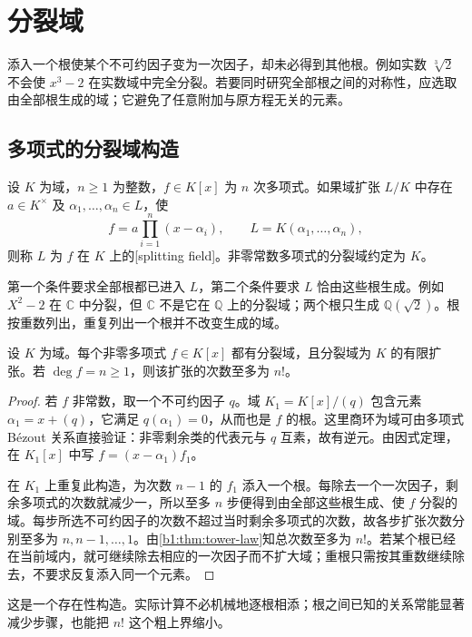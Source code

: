 
\section{分裂域}
\label{b1:sec:1501}


%
%

添入一个根使某个不可约因子变为一次因子，却未必得到其他根。例如实数 \(\sqrt[3]2\) 不会使 \(x^3-2\) 在实数域中完全分裂。若要同时研究全部根之间的对称性，应选取由全部根生成的域；它避免了任意附加与原方程无关的元素。

\subsection{多项式的分裂域构造}
\label{b1:subsec:1501:01}

\begin{definition}\label{b1:def:splitting-field}
	设 \(K\) 为域，\(n\geq1\) 为整数，\(f\in K[x]\) 为 \(n\) 次多项式。如果域扩张 \(L/K\) 中存在 \(a\in K^\times\) 及 \(\alpha_1,\ldots,\alpha_n\in L\)，使
	\[
		f=a\prod_{i=1}^n(x-\alpha_i),\qquad L=K(\alpha_1,\ldots,\alpha_n),
	\]
	则称 \(L\) 为 \(f\) 在 \(K\) 上的[splitting field]。非零常数多项式的分裂域约定为 \(K\)。
\end{definition}
第一个条件要求全部根都已进入 \(L\)，第二个条件要求 \(L\) 恰由这些根生成。例如 \(X^2-2\) 在 \(\mathbb C\) 中分裂，但 \(\mathbb C\) 不是它在 \(\mathbb Q\) 上的分裂域；两个根只生成 \(\mathbb Q(\sqrt2)\)。根按重数列出，重复列出一个根并不改变生成的域。

\begin{proposition}\label{b1:prop:splitting-field-exists}
	设 \(K\) 为域。每个非零多项式 \(f\in K[x]\) 都有分裂域，且分裂域为 \(K\) 的有限扩张。若 \(\deg f=n\geq1\)，则该扩张的次数至多为 \(n!\)。
\end{proposition}
\begin{proof}
	若 \(f\) 非常数，取一个不可约因子 \(q\)。域 \(K_1=K[x]/(q)\) 包含元素 \(\alpha_1=x+(q)\)，它满足 \(q(\alpha_1)=0\)，从而也是 \(f\) 的根。这里商环为域可由多项式 Bézout 关系直接验证：非零剩余类的代表元与 \(q\) 互素，故有逆元。由因式定理，在 \(K_1[x]\) 中写 \(f=(x-\alpha_1)f_1\)。

	在 \(K_1\) 上重复此构造，为次数 \(n-1\) 的 \(f_1\) 添入一个根。每除去一个一次因子，剩余多项式的次数就减少一，所以至多 \(n\) 步便得到由全部这些根生成、使 \(f\) 分裂的域。每步所选不可约因子的次数不超过当时剩余多项式的次数，故各步扩张次数分别至多为 \(n,n-1,\ldots,1\)。由\cref{b1:thm:tower-law}知总次数至多为 \(n!\)。若某个根已经在当前域内，就可继续除去相应的一次因子而不扩大域；重根只需按其重数继续除去，不要求反复添入同一个元素。
\end{proof}
这是一个存在性构造。实际计算不必机械地逐根相添；根之间已知的关系常能显著减少步骤，也能把 \(n!\) 这个粗上界缩小。


